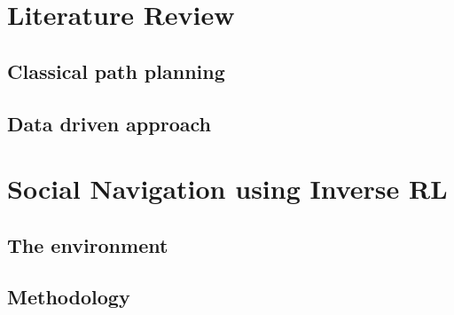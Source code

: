 \documentclass[letter,12pt,TexShade,oneside]{book}
\begin{document}
\pagestyle{fancyplain}




\onehalfspacing




%
%



\graphicspath{{img/}}




\part{Literature Review}
\label{part:part1}
\chapter{Classical path planning}
\label{ch:chapter1}

\chapter{Data driven approach}
\label{ch:chapter2}

\part{Social Navigation using Inverse RL}
\chapter{The environment}
\label{ch:part3_chapter1}

\chapter{Methodology}
\label{ch:part3_chapter2}

\end{document}
